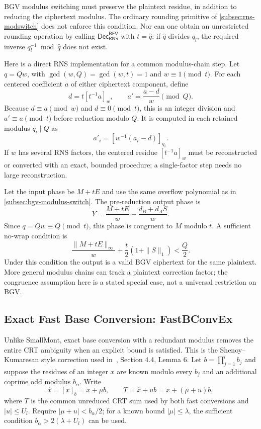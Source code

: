 BGV modulus switching must preserve the plaintext residue, in addition to reducing the ciphertext modulus. The ordinary rounding primitive of \autoref{subsec:rns-modswitch} does not enforce this condition. Nor can one obtain an unrestricted rounding operation by calling $\textsf{Dec}_{\textsf{RNS}}^{\textsf{BFV}}$ with $t=\hat q$: if $\hat q$ divides $q_l$, the required inverse $q_l^{-1}\bmod\hat q$ does not exist.

Here is a direct RNS implementation for a common modulus-chain step. Let $q=Qw$, with $\gcd(w,Q)=\gcd(w,t)=1$ and $w\equiv1\pmod t$. For each centered coefficient $a$ of either ciphertext component, define
\[
d=t[t^{-1}a]_w,\qquad a'=\frac{a-d}{w}\pmod Q.
\]
Because $d\equiv a\pmod w$ and $d\equiv0\pmod t$, this is an integer division and $a'\equiv a\pmod t$ before reduction modulo $Q$. It is computed in each retained modulus $q_i\mid Q$ as
\[
a'_i=[w^{-1}(a_i-d)]_{q_i}.
\]
If $w$ has several RNS factors, the centered residue $[t^{-1}a]_w$ must be reconstructed or converted with an exact, bounded procedure; a single-factor step needs no large reconstruction.

Let the input phase be $M+tE$ and use the same overflow polynomial as in \autoref{subsec:bgv-modulus-switch}. The pre-reduction output phase is
\[
Y=\frac{M+tE}{w}-\frac{d_B+d_AS}{w}.
\]
Since $q=Qw\equiv Q\pmod t$, this phase is congruent to $M$ modulo $t$. A sufficient no-wrap condition is
\[
\frac{\|M+tE\|_\infty}{w}+\frac{t}{2}(1+\|S\|_1)<\frac Q2.
\]
Under this condition the output is a valid BGV ciphertext for the same plaintext. More general modulus chains can track a plaintext correction factor; the congruence assumption here is a stated special case, not a universal restriction on BGV.


\subsection{Exact Fast Base Conversion: \textsf{FastBConvEx}}
\label{subsec:rns-fastbconvex}

Unlike \textsf{SmallMont}, exact base conversion with a redundant modulus removes the entire CRT ambiguity when an explicit bound is satisfied. This is the Shenoy--Kumaresan style correction used in~\cite{rns-bfv}, Section 4.4, Lemma 6. Let $b=\prod_{j=1}^lb_j$ and suppose the residues of an integer $x$ are known modulo every $b_j$ and an additional coprime odd modulus $b_\alpha$. Write
\[
\widehat x=[x]_b=x+\mu b,\qquad
T=\widehat x+ub=x+(\mu+u)b,
\]
where $T$ is the common unreduced CRT sum used by both fast conversions and $|u|\leq U_l$. Require $|\mu+u|<b_\alpha/2$; for a known bound $|\mu|\leq\lambda$, the sufficient condition $b_\alpha>2(\lambda+U_l)$ can be used.

